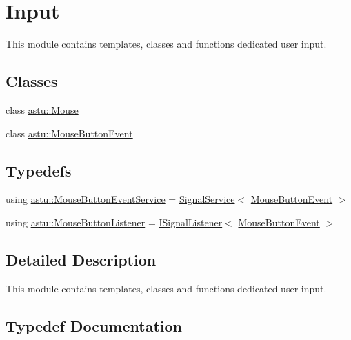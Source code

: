 \hypertarget{group__input__group}{}\section{Input}
\label{group__input__group}


This module contains templates, classes and functions dedicated user input.  


\subsection*{Classes}
\begin{DoxyCompactItemize}
\item 
class \hyperlink{classastu_1_1Mouse}{astu\+::\+Mouse}
\item 
class \hyperlink{classastu_1_1MouseButtonEvent}{astu\+::\+Mouse\+Button\+Event}
\end{DoxyCompactItemize}
\subsection*{Typedefs}
\begin{DoxyCompactItemize}
\item 
using \hyperlink{group__input__group_ga720d9f880198971a77aad9ba69cc3633}{astu\+::\+Mouse\+Button\+Event\+Service} = \hyperlink{classastu_1_1SignalService}{Signal\+Service}$<$ \hyperlink{classastu_1_1MouseButtonEvent}{Mouse\+Button\+Event} $>$
\item 
using \hyperlink{group__input__group_ga4358d168fa211f641ec8176f279f421b}{astu\+::\+Mouse\+Button\+Listener} = \hyperlink{classastu_1_1ISignalListener}{I\+Signal\+Listener}$<$ \hyperlink{classastu_1_1MouseButtonEvent}{Mouse\+Button\+Event} $>$
\end{DoxyCompactItemize}


\subsection{Detailed Description}
This module contains templates, classes and functions dedicated user input. 



\subsection{Typedef Documentation}
\mbox{\label{group__input__group_ga720d9f880198971a77aad9ba69cc3633}} 
